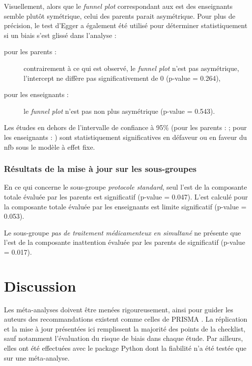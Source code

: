 Visuellement, alors que le \textit{funnel plot} correspondant aux \gls{est} des enseignants semble plutôt symétrique, celui des parents parait asymétrique. 
Pour plus de précision, le test d'Egger a également été utilisé pour déterminer statistiquement si un biais s'est glissé dans l'analyse \citep{Egger1997} :
\begin{description}
\item[pour les parents :] contrairement à ce qui est observé, le \textit{funnel plot} n'est pas asymétrique, l'intercept ne diffère pas 
significativement de 0 (p-value = 0.264),
\item[pour les enseignants :]  le \textit{funnel plot} n'est pas non plus asymétrique (p-value = 0.543).
\end{description}

Les études en dehors de l'intervalle de confiance à 95\% (pour les parents : \citet{Christiansen2014} ; pour les enseignants : \citet{Moreno2019, Shereena2019}) 
sont statistiquement significatives en défaveur \citep{Christiansen2014} ou en faveur du \gls{nfb} \citep{Moreno2019, Shereena2019} sous le modèle à effet fixe.
 
\subsubsection{Résultats de la mise à jour sur les sous-groupes}
 
En ce qui concerne le sous-groupe \emph{protocole standard}, seul l'\gls{est} de la composante totale évaluée par les parents est significatif (p-value = 0.047). 
L'\gls{est} calculé pour la composante totale évaluée par les enseignants est limite significatif (p-value = 0.053).

Le sous-groupe \emph{pas de traitement médicamenteux en simultané} ne présente que l'\gls{est} de la composante inattention évaluée par les parents de 
significatif (p-value = 0.017).

\section{Discussion} 

Les méta-analyses doivent être menées rigoureusement, ainsi pour guider les auteurs des recommandations existent comme celles de PRISMA \citep{Moher2009}.
La réplication et la mise à jour présentées ici remplissent la majorité des points de la checklist, sauf notamment l'évaluation du risque de biais dans chaque étude.
Par ailleurs, elles ont été effectuées avec le package Python dont la fiabilité n'a été testée que sur une méta-analyse.
 

